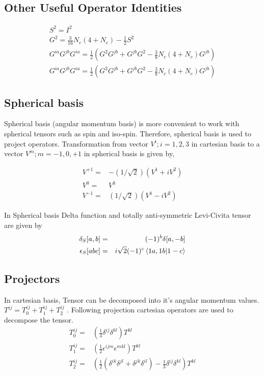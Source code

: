 \documentclass{article}
\newcommand{\bea}{\begin{eqnarray}}
\newcommand{\eea}{\end{eqnarray}}
\begin{document}
\subsection{Other Useful Operator Identities}

\bea 
S^2=I^2  \\
G^2= \frac{3}{16} N_c (4+N_c) -\frac{1}{2}S^2  \\
G^{ia}G^{jb}G^{ia}=\frac{1}{2}\left( G^2 G^{jb} +G^{jb}G^2 - \frac{3}{8} N_c (4+N_c)G^{jb} \right) \\
G^{ia}G^{jb}G^{ia}=\frac{1}{2}\left( G^2 G^{jb} +G^{jb}G^2 - \frac{3}{8} N_c (4+N_c)G^{jb} \right)
\eea


\subsection{Spherical basis}

Spherical basis (angular momentum basis) is more convenient to work with spherical tensors such as spin and iso-spin. Therefore, spherical basis is used to project operators. Transformation  from vector $ V^i ; i=1,2,3 $ in cartesian basis to a vector $V^m ;m=-1,0,+1 $ in spherical basis is given by,

\bea 
V^{+1}=&-(1/\sqrt{2})(V^1+iV^2) \nonumber \\
V^{0}=&V^3 \\
V^{-1}=&(1/\sqrt{2})(V^1-iV^2) \nonumber 
\eea


In Spherical basis Delta function and totally anti-symmetric Levi-Civita tensor are given by
\bea 
\delta_S[a,b]=&&(-1)^b\delta[a,-b] \nonumber \\
\epsilon_S[abc] =&& i \sqrt{2} (-1)^c \bra{1a,1b} \ket{1-c}
\eea

\subsection{Projectors}

In cartesian basis, Tensor can be decomposed into it's angular momentum values. $T^{ij}=T^{ij}_0+T^{ij}_1+T^{ij}_2$ . Following projection cartesian operators are used to decompose the tensor.
\bea 
T^{ij}_0=& \left( \frac{1}{3}\delta^{ij}\delta^{kl} \right) T^{kl} \nonumber \\
T^{ij}_1=& \left( \frac{1}{2}\epsilon^{ijm}\epsilon^{mkl} \right) T^{kl} \\
T^{ij}_2=& \left(\frac{1}{2}(\delta^{ik}\delta^{jl}+\delta^{jk}\delta^{il}) -\frac{1}{3}\delta^{ij}\delta^{kl} \right) T^{kl} \nonumber 
\eea
\end{document}
